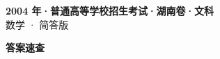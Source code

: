 \documentclass[zihao=-4, a4paper]{ctexart}
\begin{document}
\begin{center}
  {\Large\bfseries 2004 年·普通高等学校招生考试·湖南卷·文科}\\[4pt]
  {\large 数学 · 简答版}
\end{center}
\medskip
{}

\clearpage
{}
\begin{center}{\Large\bfseries 答案速查}\end{center}
\medskip

\end{document}

